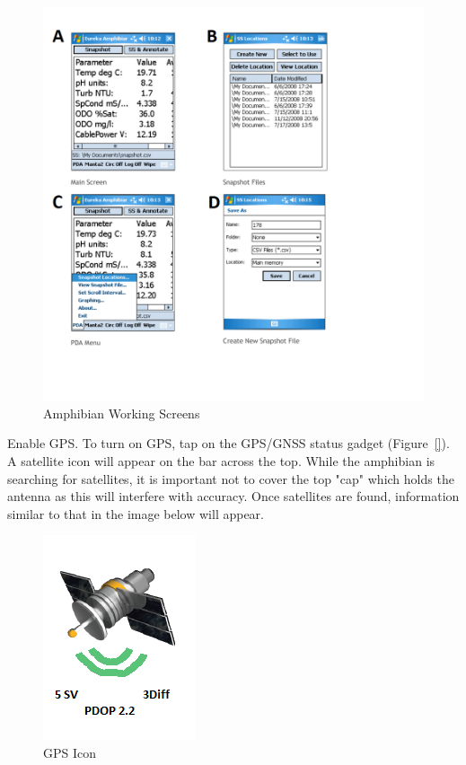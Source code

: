 \documentclass[12pt]{../SOP3_beta}\usepackage[]{graphicx}\usepackage[]{color}
\begin{document}
\begin{figure}[h]
\centering
\includegraphics[scale=0.6]{AmphibianMain.png}
\caption{Amphibian Working Screens}
\label{fig:AmphibianMain.png}
\end{figure}

\NP Enable GPS. To turn on GPS, tap on the GPS/GNSS status gadget (Figure~\ref{}). A satellite icon will appear on the bar across the top. While the amphibian is searching for satellites, it is important not to cover the top "cap" which holds the antenna as this will interfere with accuracy. Once satellites are found, information similar to that in the image below will appear.

\begin{figure}[h]
\centering
\includegraphics{GPS.png}
\caption{GPS Icon}
\label{GPS.png}
\end{figure}
\end{document}
